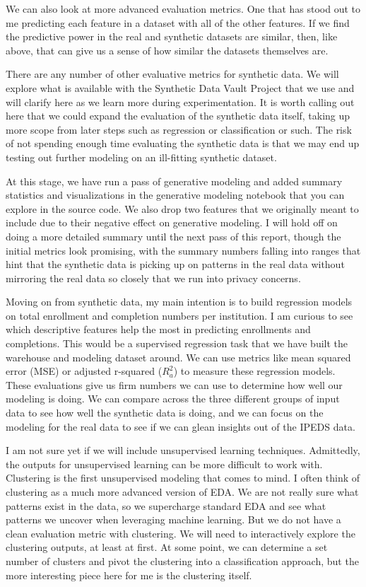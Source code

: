 \documentclass[sigconf, authorversion, nonacm]{acmart}
\begin{document}
    We can also look at more advanced evaluation metrics. One that has stood out to me predicting each feature in a dataset with all of the other features. If we find the predictive power in the real and synthetic datasets are similar, then, like above, that can give us a sense of how similar the datasets themselves are.

    There are any number of other evaluative metrics for synthetic data. We will explore what is available with the Synthetic Data Vault Project that we use and will clarify here as we learn more during experimentation. It is worth calling out here that we could expand the evaluation of the synthetic data itself, taking up more scope from later steps such as regression or classification or such. The risk of not spending enough time evaluating the synthetic data is that we may end up testing out further modeling on an ill-fitting synthetic dataset.

    At this stage, we have run a pass of generative modeling and added summary statistics and visualizations in the generative modeling notebook that you can explore in the source code. We also drop two features that we originally meant to include due to their negative effect on generative modeling. I will hold off on doing a more detailed summary until the next pass of this report, though the initial metrics look promising, with the summary numbers falling into ranges that hint that the synthetic data is picking up on patterns in the real data without mirroring the real data so closely that we run into privacy concerns.

    Moving on from synthetic data, my main intention is to build regression models on total enrollment and completion numbers per institution. I am curious to see which descriptive features help the most in predicting enrollments and completions. This would be a supervised regression task that we have built the warehouse and modeling dataset around. We can use metrics like mean squared error (MSE) or adjusted r-squared ($R^2_a$) to measure these regression models. These evaluations give us firm numbers we can use to determine how well our modeling is doing. We can compare across the three different groups of input data to see how well the synthetic data is doing, and we can focus on the modeling for the real data to see if we can glean insights out of the IPEDS data.

    I am not sure yet if we will include unsupervised learning techniques. Admittedly, the outputs for unsupervised learning can be more difficult to work with. Clustering is the first unsupervised modeling that comes to mind. I often think of clustering as a much more advanced version of EDA. We are not really sure what patterns exist in the data, so we supercharge standard EDA and see what patterns we uncover when leveraging machine learning. But we do not have a clean evaluation metric with clustering. We will need to interactively explore the clustering outputs, at least at first. At some point, we can determine a set number of clusters and pivot the clustering into a classification approach, but the more interesting piece here for me is the clustering itself.
\end{document}
